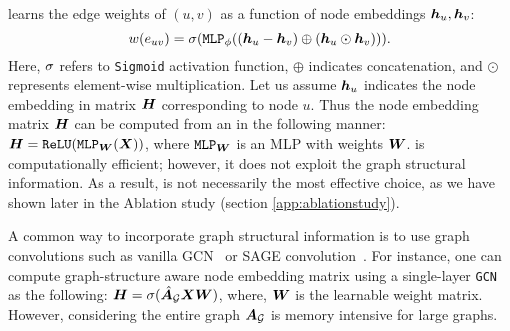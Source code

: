 % 
\edgemlp learns the edge weights of $(u,v)$ as a function of node embeddings ${\bm{h}}_u,{\bm{h}}_v$:
\begin{equation}
\label{eq:w_uv}
w(e_{uv}) = \sigma(\texttt{MLP}_{\phi}(({\bm{h}}_u - {\bm{h}}_v) \oplus ({\bm{h}}_u \odot {\bm{h}}_v))).
\end{equation}
Here, $\sigma$ refers to \texttt{Sigmoid} activation function, $\oplus$ indicates concatenation, and $\odot$ represents element-wise multiplication. Let us assume ${\bm{h}}_u$ indicates the node embedding in matrix ${\bm{H}}$ corresponding to node $u$. Thus the node embedding matrix ${\bm{H}}$ can be computed from an \mlp in the following manner: 
${\bm{H}} = \texttt{ReLU}(\texttt{MLP}_{\bm{W}}({\bm{X}}))$, where $\texttt{MLP}_{\bm{W}}$ is an MLP with weights ${\bm{W}}$. 
\mlp is computationally efficient; however, it does not exploit the graph structural information. As a result, \mlp is not necessarily the most effective choice, as we have shown later in the Ablation study (section \ref{app:ablationstudy}).

A common way to incorporate graph structural information  is to use graph convolutions such as vanilla GCN~\cite{kipf2016semi} or SAGE convolution~\cite{hamilton2017inductive}.
For instance, one can compute graph-structure aware node embedding matrix using a single-layer \texttt{GCN} as the following: ${\bm{H}} = \sigma(\hat{{\bm{A}}}_{\mathcal{G}}{\bm{X}}{\bm{W}})$,  where, ${\bm{W}}$ is the learnable weight matrix. However, considering the entire graph ${\bm{A}}_{\mathcal{G}}$ is memory intensive for large graphs. 

